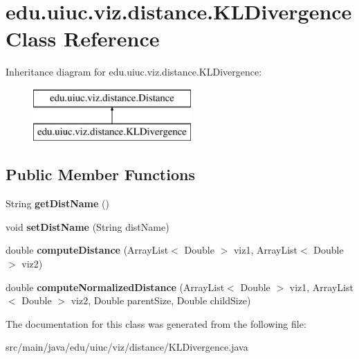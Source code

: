 \hypertarget{classedu_1_1uiuc_1_1viz_1_1distance_1_1_k_l_divergence}{}\section{edu.\+uiuc.\+viz.\+distance.\+K\+L\+Divergence Class Reference}
\label{classedu_1_1uiuc_1_1viz_1_1distance_1_1_k_l_divergence}
Inheritance diagram for edu.\+uiuc.\+viz.\+distance.\+K\+L\+Divergence\+:\begin{figure}[H]
\begin{center}
\leavevmode
\includegraphics[height=2.000000cm]{classedu_1_1uiuc_1_1viz_1_1distance_1_1_k_l_divergence}
\end{center}
\end{figure}
\subsection*{Public Member Functions}
\begin{DoxyCompactItemize}
\item 
\mbox{\label{classedu_1_1uiuc_1_1viz_1_1distance_1_1_k_l_divergence_a12f831c2a19c3809cf78d176a2df6f56}} 
String {\bfseries get\+Dist\+Name} ()
\item 
\mbox{\label{classedu_1_1uiuc_1_1viz_1_1distance_1_1_k_l_divergence_ae430ea0869c09cb3c8cd4a656a1f7fa3}} 
void {\bfseries set\+Dist\+Name} (String dist\+Name)
\item 
\mbox{\label{classedu_1_1uiuc_1_1viz_1_1distance_1_1_k_l_divergence_aaadcd0cd3de314e4e35081c4292b1e29}} 
double {\bfseries compute\+Distance} (Array\+List$<$ Double $>$ viz1, Array\+List$<$ Double $>$ viz2)
\item 
\mbox{\label{classedu_1_1uiuc_1_1viz_1_1distance_1_1_k_l_divergence_a0a79bdd13fb2af9ccb2bfa25d422d436}} 
double {\bfseries compute\+Normalized\+Distance} (Array\+List$<$ Double $>$ viz1, Array\+List$<$ Double $>$ viz2, Double parent\+Size, Double child\+Size)
\end{DoxyCompactItemize}


The documentation for this class was generated from the following file\+:\begin{DoxyCompactItemize}
\item 
src/main/java/edu/uiuc/viz/distance/K\+L\+Divergence.\+java\end{DoxyCompactItemize}
